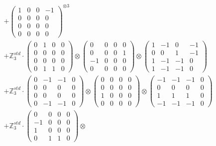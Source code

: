 \documentclass{article}
\begin{document}
{\begin{align}
        &+ \label{Rs16-Rc11-Solution-8-c16} \begin{pmatrix} 1 & 0 & 0 & -1 \\ 0 & 0 & 0 & 0 \\ 0 & 0 & 0 & 0 \\ 0 & 0 & 0 & 0 \end{pmatrix}^{\otimes 3} \\
        &+ \label{Rs16-Rc11-Solution-8-c17} \mathbb{Z}_3^{std} \cdot 
            \begin{pmatrix} 0 & 1 & 0 & 0 \\ 0 & 0 & 0 & 0 \\ 0 & 0 & 0 & 0 \\ 0 & 1 & 1 & 0 \end{pmatrix} \otimes 
            \begin{pmatrix} 0 & 0 & 0 & 0 \\ 0 & 0 & 0 & 1 \\ -1 & 0 & 0 & 0 \\ 0 & 0 & 0 & 0 \end{pmatrix} \otimes 
            \begin{pmatrix} 1 & -1 & 0 & -1 \\ 0 & 0 & 1 & -1 \\ 1 & -1 & -1 & 0 \\ 1 & -1 & -1 & 0 \end{pmatrix} \\ 
        &+ \label{Rs16-Rc11-Solution-8-c18} \mathbb{Z}_3^{std} \cdot 
            \begin{pmatrix} 0 & -1 & -1 & 0 \\ 0 & 0 & 0 & 0 \\ 0 & 0 & 0 & 0 \\ 0 & -1 & -1 & 0 \end{pmatrix} \otimes 
            \begin{pmatrix} 0 & 0 & 0 & 0 \\ 0 & 0 & 0 & 0 \\ 1 & 0 & 0 & 0 \\ 0 & 0 & 0 & 0 \end{pmatrix} \otimes 
            \begin{pmatrix} -1 & -1 & -1 & 0 \\ 0 & 0 & 0 & 0 \\ 1 & 1 & 1 & 0 \\ -1 & -1 & -1 & 0 \end{pmatrix} \\ 
        &+ \label{Rs16-Rc11-Solution-8-c19} \mathbb{Z}_3^{std} \cdot 
            \begin{pmatrix} 0 & 0 & 0 & 0 \\ -1 & 0 & 0 & 0 \\ 1 & 0 & 0 & 0 \\ 0 & 1 & 1 & 0 \end{pmatrix} \otimes 

\end{align}}
\end{document}
